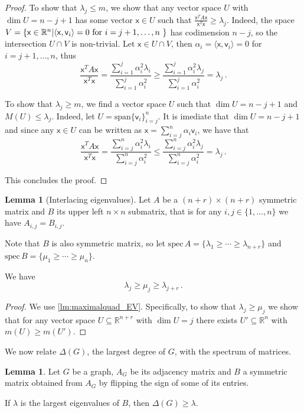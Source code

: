 \documentclass[12pt]{amsart}
\theoremstyle{definition}
\newtheorem{lm}[thm]{Lemma}
\newcommand{\R}{\mathbb{R}}
\newcommand{\vv}{\mathsf{v}}
\newcommand{\vx}{\mathsf{x}}
\newcommand{\spn}{\mathrm{span}}
\newcommand{\spec}{\mathrm{spec} }
\begin{document}
\begin{proof}
To show that $\lambda_j \leq m$, we show that any vector space $U$ with $\dim U =  n - j + 1 $ has some vector $\vx \in U $ such that $\frac{\vx^T A \vx}{\vx^T \vx} \geq \lambda_j$.
Indeed, the space $V = \{ \vx \in \R^n | \langle \vx , \vv_i \rangle = 0 \text{ for $ i = j+1, \ldots, n$ } \}$ has codimension $n-j$, so the intersection $U\cap V$ is non-trivial.
Let $\vx \in U \cap V$, then $\alpha_i = \langle \vx , \vv_i \rangle = 0 $ for $i = j+1, \ldots, n$, thus 
$$\frac{\vx^T A \vx}{\vx^T \vx} = \frac{\sum_{i=1}^j \alpha_i^2 \lambda_i}{\sum_{i=1}^j \alpha_i^2} \geq \frac{\sum_{i=1}^j \alpha_i^2 \lambda_j}{\sum_{i=1}^j \alpha_i^2}= \lambda_j\, . $$

To show that  $\lambda_j \geq m$, we find a vector space $U$ such that $\dim U = n-j+1 $ and $M(U) \leq \lambda_j$.
Indeed, let $U = \spn \{\vv_i\}_{i=j}^n$.
It is imediate that $\dim U = n-j+1$ and since any $\vx \in U $ can be written as $\vx = \sum_{i=j}^n \alpha_i \vv_i$, we have that 
$$\frac{\vx^T A \vx}{\vx^T \vx} = \frac{\sum_{i=j}^n \alpha_i^2 \lambda_i}{\sum_{i=j}^n \alpha_i^2} \leq \frac{\sum_{i=j}^n \alpha_i^2 \lambda_j}{\sum_{i=j}^n \alpha_i^2}= \lambda_j\, . $$

This concludes the proof.
\end{proof}

\begin{lm}[Interlacing eigenvalues]\label{lm:interlacing}
Let $A$ be a $(n+r)\times (n+r)$ symmetric matrix and $B$ its upper left $n\times n$ submatrix, that is for any $i, j \in \{1, \ldots, n\}$ we have $A_{i, j} = B_{i, j}$.

Note that $B$ is also symmetric matrix, so let $\spec \, A = \{\lambda_1 \geq \cdots \geq \lambda_{n+r}\}$ and $\spec \, B = \{\mu_1 \geq \cdots \geq \mu_n\}$.

We have
$$ \lambda_j \geq \mu_j \geq \lambda_{j+r}\, . $$
\end{lm}

\begin{proof}
We use \cref{lm:maximalquad_EV}.
Specifically, to show that $\lambda_j \geq \mu_j$ we show that for any vector space $U\subseteq \R^{n+r}$ with $\dim U = j$ there exists $U'\subseteq \R^n$ with $m(U) \geq m(U')$.

\end{proof}

We now relate $\Delta(G)$, the largest degree of $G$, with the spectrum of matrices.

\begin{lm}\label{lm:adjacency_delta}
Let $G$ be a graph, $A_G$ be its adjacency matrix and $B$ a symmetric matrix obtained from $A_G$ by flipping the sign of some of its entries.

If $\lambda $ is the largest eigenvalues of $B$, then $\Delta(G) \geq \lambda $.
\end{lm}
\end{document}
